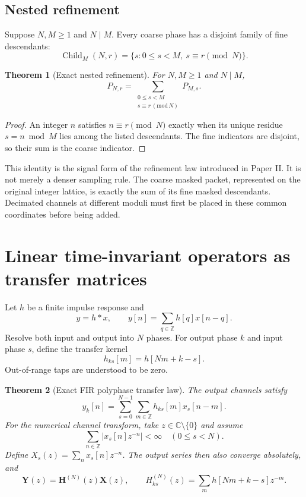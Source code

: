 \documentclass[11pt,a4paper]{article}
\newtheorem{theorem}{Theorem}[section]
\theoremstyle{definition}
\theoremstyle{remark}
\newcommand{\bbC}{\mathbb C}
\newcommand{\bbZ}{\mathbb Z}
\begin{document}
\subsection{Nested refinement}

Suppose $N,M\ge1$ and $N\mid M$. Every coarse phase has a disjoint family of fine descendants:
\[
\operatorname{Child}_{M}(N,r)
=
\{s:0\le s<M,\ s\equiv r\pmod N\}.
\]

\begin{theorem}[Exact nested refinement]\label{result:04}
For $N,M\ge1$ and $N\mid M$,
\[
\boxed{
P_{N,r}
=
\sum_{\substack{0\le s<M\\s\equiv r\, (\mathrm{mod}\,N)}}P_{M,s}.
}
\]
\end{theorem}

\begin{proof}
An integer $n$ satisfies $n\equiv r\pmod N$ exactly when its unique residue $s=n\bmod M$ lies among the listed descendants. The fine indicators are disjoint, so their sum is the coarse indicator.
\end{proof}

This identity is the signal form of the refinement law introduced in Paper II. It is not merely a denser sampling rule. The coarse masked packet, represented on the original integer lattice, is exactly the sum of its fine masked descendants. Decimated channels at different moduli must first be placed in these common coordinates before being added.

\section{Linear time-invariant operators as transfer matrices}\label{core:section:03}

Let $h$ be a finite impulse response and
\[
y=h*x,
\qquad
y[n]=\sum_{q\in\bbZ}h[q]x[n-q].
\]
Resolve both input and output into $N$ phases. For output phase $k$ and input phase $s$, define the transfer kernel
\[
\boxed{
h_{ks}[m]=h[Nm+k-s].
}
\]
Out-of-range taps are understood to be zero.

\begin{theorem}[Exact FIR polyphase transfer law]\label{result:05}
The output channels satisfy
\[
\boxed{
y_k[n]
=
\sum_{s=0}^{N-1}\sum_{m\in\bbZ}
h_{ks}[m]x_s[n-m].
}
\]
For the numerical channel transform, take $z\in\bbC\setminus\{0\}$ and assume
\[
\sum_{n\in\bbZ}|x_s[n]z^{-n}|<\infty\quad(0\le s<N).
\]
Define $X_s(z)=\sum_nx_s[n]z^{-n}$. The output series then also converge absolutely, and
\[
\bm Y(z)=\bm H^{(N)}(z)\bm X(z),
\qquad
H^{(N)}_{ks}(z)=\sum_m h[Nm+k-s]z^{-m}.
\]
\end{theorem}
\end{document}
